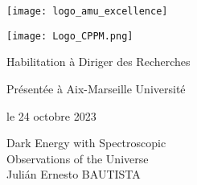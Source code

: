 
\begin{center}
	\begin{minipage}[c]{.5\linewidth}
		\raggedright\texttt{[image: logo\_amu\_excellence]}
	\end{minipage}\hfill
	\begin{minipage}[c]{.5\linewidth}
		\raggedleft\texttt{[image: Logo\_CPPM.png]} %
	\end{minipage}\hfill
\end{center}

\vspace{1em}

\begin{center}
	\begin{minipage}[c]{.85\linewidth}
		\dhorline{\textwidth}{4pt}
	\end{minipage}\hfill
	\begin{minipage}[c]{.35\linewidth}
	\end{minipage}\hfill
\end{center}


\begin{flushleft}
    \HUGE\textcolor{cyanamu}{Habilitation à Diriger des Recherches}\\
	\vspace{.3em}
	
	{\Large Présentée à Aix-Marseille Université}\\
	
	\vspace{.3em}

	{\Large le 24 octobre 2023}\\
\end{flushleft}
\vspace{1.5em}
\begin{center}
	{\Huge Dark Energy with Spectroscopic \\ Observations of the Universe }\\
    \vspace{1em}
	{\LARGE Julián Ernesto BAUTISTA}\\
\end{center}

